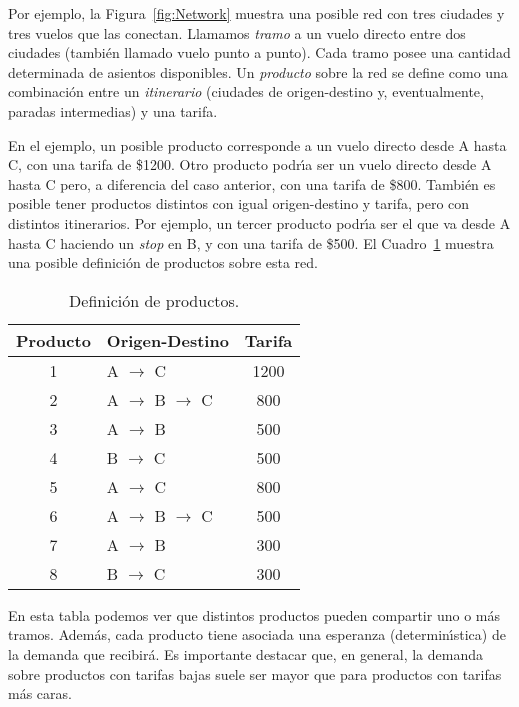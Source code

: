 \documentclass[11pt, a4paper]{article}
\begin{document}
Por ejemplo, la Figura~\ref{fig:Network} muestra una posible red con tres
ciudades y tres vuelos que las conectan.
Llamamos \emph{tramo} a un vuelo directo entre dos ciudades (tambi\'en
llamado vuelo punto a punto). Cada tramo posee una cantidad determinada de
asientos disponibles. Un \emph{producto} sobre la red se define como una
combinaci\'on entre un \emph{itinerario} (ciudades de origen-destino y,
eventualmente, paradas intermedias) y una tarifa.

En el ejemplo, un posible
producto corresponde a un vuelo directo desde A hasta C, con una tarifa de
\$1200. Otro producto podr\'{\i}a ser un vuelo directo desde A hasta C pero,
a diferencia del caso anterior, con una tarifa de \$800. Tambi\'en es
posible tener productos distintos con igual origen-destino y tarifa, pero
con distintos itinerarios. Por ejemplo, un tercer producto podr\'\i a ser
el que va desde A hasta C haciendo un \emph{stop} en B, y con una tarifa de
\$500. El Cuadro~\ref{table:Products} muestra una posible definici\'on de
productos sobre esta red.

\begin{table}[!h]
{\small
\begin{center}
\begin{tabular}{|c|l|c|}
\hline
Producto & Origen-Destino & Tarifa\\
\hline
1 & A $\rightarrow$ C & 1200\\
2 & A $\rightarrow$ B $\rightarrow$ C & 800\\
3 & A $\rightarrow$ B & 500\\
4 & B $\rightarrow$ C & 500\\
5 & A $\rightarrow$ C & 800\\
6 & A $\rightarrow$ B $\rightarrow$ C & 500\\
7 & A $\rightarrow$ B & 300\\
8 & B $\rightarrow$ C & 300\\
\hline
\end{tabular}
\caption{Definici\'on de productos.}
\label{table:Products}
\end{center}
}
\vspace*{-4mm}
\end{table}

En esta tabla podemos ver que distintos productos pueden compartir uno o m\'as
tramos. Adem\'as, cada producto tiene asociada una esperanza
(determin\'{\i}stica) de la demanda que recibir\'a. Es importante destacar
que, en general, la demanda sobre productos con tarifas bajas suele
ser mayor que para productos con tarifas m\'as caras.
\end{document}

